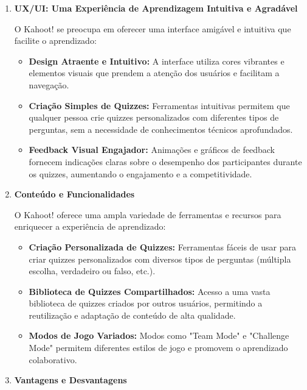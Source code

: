 \begin{enumerate}
    \item \textbf{UX/UI: Uma Experiência de Aprendizagem Intuitiva e Agradável}
    
    O Kahoot! se preocupa em oferecer uma interface amigável e intuitiva que facilite o aprendizado:

    \begin{itemize}
        \item \textbf{Design Atraente e Intuitivo:} A interface utiliza cores vibrantes e elementos visuais que prendem a atenção dos usuários e facilitam a navegação.
        \item \textbf{Criação Simples de Quizzes:} Ferramentas intuitivas permitem que qualquer pessoa crie quizzes personalizados com diferentes tipos de perguntas, sem a necessidade de conhecimentos técnicos aprofundados.
        \item \textbf{Feedback Visual Engajador:} Animações e gráficos de feedback fornecem indicações claras sobre o desempenho dos participantes durante os quizzes, aumentando o engajamento e a competitividade.
    \end{itemize}

    \item \textbf{Conteúdo e Funcionalidades}
    
    O Kahoot! oferece uma ampla variedade de ferramentas e recursos para enriquecer a experiência de aprendizado:

    \begin{itemize}
        \item \textbf{Criação Personalizada de Quizzes:} Ferramentas fáceis de usar para criar quizzes personalizados com diversos tipos de perguntas (múltipla escolha, verdadeiro ou falso, etc.).
        \item \textbf{Biblioteca de Quizzes Compartilhados:} Acesso a uma vasta biblioteca de quizzes criados por outros usuários, permitindo a reutilização e adaptação de conteúdo de alta qualidade.
        \item \textbf{Modos de Jogo Variados:} Modos como "Team Mode" e "Challenge Mode" permitem diferentes estilos de jogo e promovem o aprendizado colaborativo.
    \end{itemize}

    \item \textbf{Vantagens e Desvantagens}
    

\end{enumerate}
